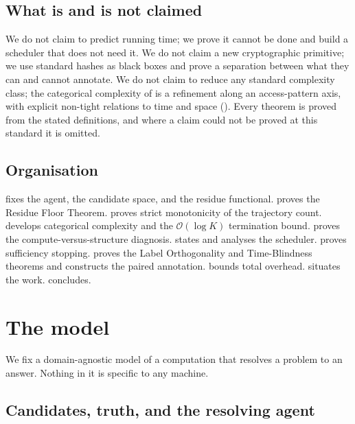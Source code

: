 \documentclass[twocolumn,10pt,a4paper]{article}
\theoremstyle{thmstyle}
\theoremstyle{definition}
\theoremstyle{remark}
\begin{document}
\subsection{What is and is not claimed}

We do not claim to predict running time; we prove it cannot be done and
build a scheduler that does not need it. We do not claim a new
cryptographic primitive; we use standard hashes as black boxes and prove
a separation between what they can and cannot annotate. We do not claim
to reduce any standard complexity class; the categorical complexity of
 is a refinement along an access-pattern axis, with
explicit non-tight relations to time and space
(). Every theorem is proved from the stated
definitions, and where a claim could not be proved at this standard it is
omitted.

\subsection{Organisation}

 fixes the agent, the candidate space, and the residue
functional.  proves the Residue Floor Theorem.
 proves strict monotonicity of the trajectory count.
 develops categorical complexity and the
$\mathcal{O}(\log K)$ termination bound.  proves the
compute-versus-structure diagnosis.  states and
analyses the scheduler.  proves sufficiency
stopping.  proves the Label Orthogonality and
Time-Blindness theorems and constructs the paired annotation.
 bounds total overhead.  situates
the work.  concludes.

\section{The model}
\label{sec:model}

We fix a domain-agnostic model of a computation that resolves a problem
to an answer. Nothing in it is specific to any machine.

\subsection{Candidates, truth, and the resolving agent}
\end{document}
